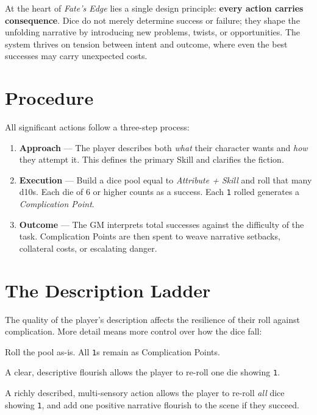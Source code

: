 \documentclass[12pt]{article}
\begin{document}
At the heart of \textit{Fate’s Edge} lies a single design principle:  
\textbf{every action carries consequence}. Dice do not merely determine success or failure; they shape the unfolding narrative by introducing new problems, twists, or opportunities. The system thrives on tension between intent and outcome, where even the best successes may carry unexpected costs.

\section{Procedure}

All significant actions follow a three-step process:

\begin{enumerate}
  \item \textbf{Approach} — The player describes both \emph{what} their character wants and \emph{how} they attempt it. This defines the primary Skill and clarifies the fiction.  
  \item \textbf{Execution} — Build a dice pool equal to \emph{Attribute + Skill} and roll that many d10s. Each die of 6 or higher counts as a success. Each \texttt{1} rolled generates a \emph{Complication Point}.  
  \item \textbf{Outcome} — The GM interprets total successes against the difficulty of the task. Complication Points are then spent to weave narrative setbacks, collateral costs, or escalating danger.  
\end{enumerate}

\section{The Description Ladder}

The quality of the player’s description affects the resilience of their roll against complication.  
More detail means more control over how the dice fall:

\begin{description}[leftmargin=2cm]
  \item[Basic Action] Roll the pool as-is. All \texttt{1}s remain as Complication Points.  
  \item[Detailed Action] A clear, descriptive flourish allows the player to re-roll one die showing \texttt{1}.  
  \item[Intricate Action] A richly described, multi-sensory action allows the player to re-roll \emph{all} dice showing \texttt{1}, and add one positive narrative flourish to the scene if they succeed.  
\end{description}
\end{document}

